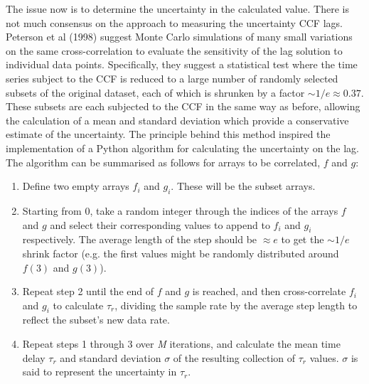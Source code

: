 The issue now is to determine the uncertainty in the calculated value. There is not much consensus on the  approach to measuring the uncertainty CCF lags\cite{peterson1998}\cite{efron1992}. Peterson et al (1998) suggest Monte Carlo simulations of many small variations on the same cross-correlation to evaluate the sensitivity of the lag solution to individual data points. Specifically, they suggest a statistical test where the time series subject to the CCF is reduced to a large number of randomly selected subsets of the original dataset, each of which is shrunken by a factor \(\sim 1/e \approx0.37\). These subsets are each subjected to the CCF in the same way as before, allowing the calculation of a mean and standard deviation which provide a conservative estimate of the uncertainty. The principle behind this method inspired the implementation of a Python algorithm for calculating the uncertainty on the lag. The algorithm can be summarised as follows for arrays to be correlated, \(f\) and \(g\):
\begin{enumerate}
    \item Define two empty arrays \(f_i\) and \(g_i\). These will be the subset arrays.
    \item Starting from 0, take a random integer  through the indices of the arrays \(f\) and \(g\) and select their corresponding values to append to \(f_i\) and \(g_i\) respectively. The average length of the step should be \(\approx e\) to get the \(\sim1/e\) shrink factor (e.g. the first values might be randomly distributed around \(f(3)\) and \(g(3)\)).
    \item Repeat step 2 until the end of \(f\) and \(g\) is reached, and then cross-correlate \(f_i\) and \(g_i\) to calculate \(\tau_r\), dividing the sample rate by the average step length to reflect the subset's new data rate.
    \item Repeat steps 1 through 3 over \textit{M} iterations, and calculate the mean time delay \(\tau_r\) and standard deviation \(\sigma\) of the resulting collection of \(\tau_r\) values. \(\sigma\) is said to represent the uncertainty in \(\tau_r\).
\end{enumerate}
\\

